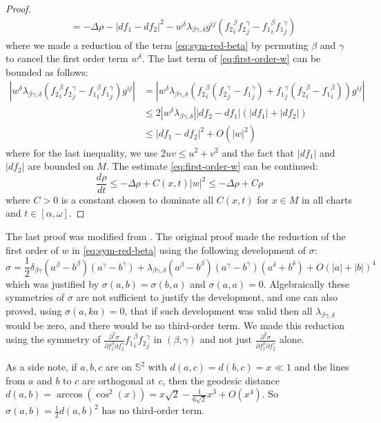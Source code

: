 \begin{proof}
\begin{align}
		   & = -\Delta \rho - |df_1 -df_2|^2 - w^\delta \lambda_{\beta\gamma,\delta}g^{ij}\left(  {f_2}^\beta_i {f_2}^\gamma_j - {f_1}^\beta_i {f_1}^\gamma_j  \right) \label{eq:first-order-w}
\end{align}
where we made a reduction of the term \eqref{eq:sym-red-beta} by permuting \(\beta\) and
\(\gamma\) to cancel the first order term \(w^\delta\). The last term of \eqref{eq:first-order-w} can be bounded as follows:
\begin{align*}
    \left | w^\delta \lambda_{\beta\gamma,\delta}\left({f_2}^\beta_i {f_2}^\gamma_j -
{f_1}^\beta_i {f_1}^\gamma_j\right) g^{ij} \right| &=   \left | w^\delta \lambda_{\beta\gamma,\delta}\left({f_2}^\beta_i ({f_2}^\gamma_j - {f_1}^\gamma_j) + {f_1}^\gamma_j({f_2}^\beta_i -
{f_1}^\beta_i) \right) g^{ij} \right| \\
	       &\leq 2 |w^\delta \lambda_{\beta\gamma,\delta}| |df_2 -df_1| (|df_1| + |df_2|)\\
	       &\leq |df_1 - df_2|^2 + O(|w|^2)
\end{align*}
where for the last inequality, we use \(2uv \leq u^2 + v^2\) and the fact that \(|df_1|\) and \(|df_2|\) are bounded on \(M\). The estimate \eqref{eq:first-order-w} can be
continued:
\[
 \frac{d \rho}{d t}\leq -\Delta\rho + C(x,t) |w|^2 \leq -\Delta \rho + C \rho
\]
where \(C >0\) is a constant chosen to dominate all \(C(x,t)\) for \(x\in M\) in all
charts and \(t\in [\alpha,\omega]\).
\end{proof}

\begin{remark}
\label{rem:hamilton-alg-rig}
The last proof was modified from \cite{hamilton_harmonic_1975}. The original proof
made the reduction of the first order of \(w\) in \eqref{eq:sym-red-beta} using
the following development of \(\sigma\):
\[
 \sigma = \frac{1}{2}\delta_{\beta\gamma} (a^\beta - b^\beta)(a^\gamma - b^\gamma) +
\lambda_{\beta\gamma,\delta} (a^\beta - b^\beta)(a^\gamma -b^\gamma)(a^\delta + b^\delta) + O(|a|+|b|)^4
\]
which was justified by \(\sigma(a,b) = \sigma(b,a)\) and \(\sigma(a,a)=0\). Algebraically these symmetries of \(\sigma\) are not sufficient to justify the
development, and one can also proved, using \(\sigma(a,ka)=0\), that if such development
was valid then all \(\lambda_{\beta\gamma,\delta}\) would be zero, and there would be no
third-order term. We made this reduction using the symmetry of \(\frac{\partial^2
\sigma}{\partial f_1^\beta \partial f_2^\gamma} {f_1}^\beta_i {f_2}^\gamma_j\) in \((\beta,\gamma)\) and not just \(\frac{\partial^2
\sigma}{\partial f_1^\beta \partial f_2^\gamma}\) alone.

As a side note, if \(a,b,c\) are on \(\mathbb{S}^2\) with \(d(a,c) = d(b,c) = x \ll 1\)
and the lines from \(a\) and \(b\) to \(c\) are orthogonal at \(c\), then the
geodesic distance \(d(a,b) = \arccos(\cos^2(x)) = x\sqrt{2} - \frac{1}{6\sqrt{2}}x^3 +
O(x^4)\). So \(\sigma(a,b) = \frac{1}{2}d(a,b)^2\) has no third-order term.
\end{remark}

